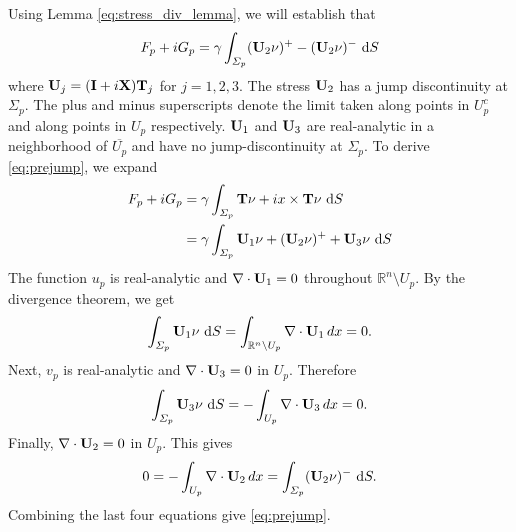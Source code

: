 \documentclass[lineno]{jfm}
\begin{document}
Using Lemma \ref{eq:stress_div_lemma}, we will establish that
\begin{equation}
  \label{eq:prejump}
  F_p + i G_p = \gamma \int_{\Sigma_p}  ({\bf U}_2\nu)^+ - ({\bf U}_2\nu)^-\,\dif S
\end{equation}
where ${\bf U}_j = ({\bf I} + i {\bf X}){\bf T}_j$ for $j = 1, 2, 3.$
The stress ${\bf U}_2$ has a jump discontinuity at $\Sigma_p.$
The plus and minus superscripts denote
the limit taken along points in $U_p^c$ and along points in $U_p$
respectively.
${\bf U}_1$ and ${\bf U}_3$ are real-analytic in a neighborhood of $\overline{U_p}$
and have no jump-discontinuity at $\Sigma_p$.
To derive \eqref{eq:prejump}, we expand
\begin{align*}
  F_p + i G_p
  &= \gamma \int_{\Sigma_p} {\bf T} \nu + ix \times {\bf T} \nu \,\dif S \\
  &= \gamma \int_{\Sigma_p}  {\bf U}_1\nu  + ({\bf U}_2\nu)^+ + {\bf U}_3\nu\,\dif S
\end{align*}
The function $u_p$ is real-analytic and
$\nabla \cdot {\bf U}_1 = 0$ throughout $\mathbb{R}^n \setminus U_p$.
By the divergence theorem, we get
\begin{equation*}
  \int_{\Sigma_p}  {\bf U}_1 \nu\,\dif S
  = \int_{\mathbb{R}^n \setminus U_p} \nabla \cdot {\bf U}_1 \,dx = 0.
\end{equation*}
Next, $v_p$ is real-analytic and
$\nabla \cdot {\bf U}_3 = 0$ in $U_p$. Therefore
\begin{equation*}
  \int_{\Sigma_p}  {\bf U}_3 \nu\,\dif S
  = -\int_{U_p} \nabla \cdot {\bf U}_3 \,dx = 0.
\end{equation*}
Finally, $\nabla \cdot {\bf U}_2= 0$ in $U_p$. This gives
\[
0 = -\int_{U_p} \nabla \cdot {\bf U}_2 \,dx = \int_{\Sigma_p}  ({\bf U}_2 \nu)^-\,\dif S.
\]
Combining the last four equations give \eqref{eq:prejump}.
\end{document}
